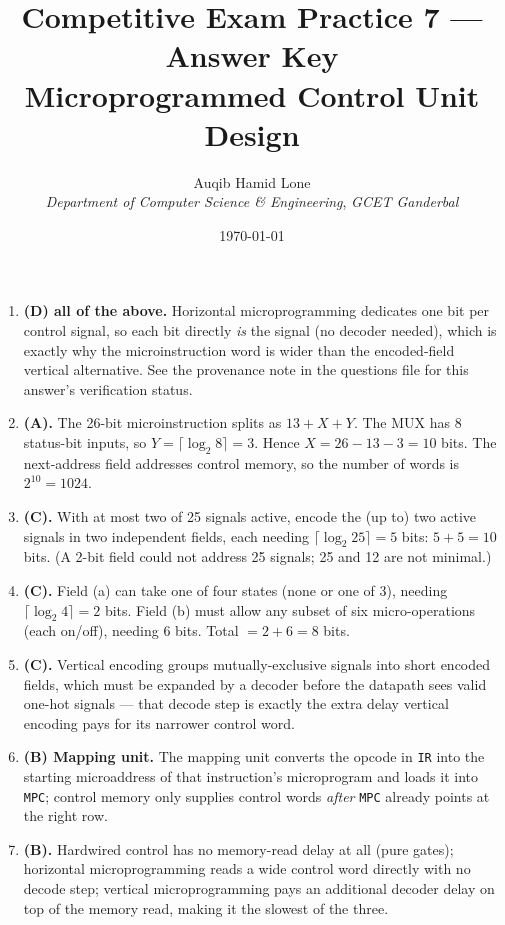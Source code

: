 \documentclass[11pt]{article}
\title{Competitive Exam Practice 7 --- Answer Key\\\large Microprogrammed Control Unit Design}
\author{Auqib Hamid Lone\\[0.3em]
  \emph{Department of Computer Science \& Engineering}, \emph{GCET Ganderbal}}
\date{\today}
\begin{document}
\maketitle

\begin{enumerate}
\item[\textbf{Q1}] \textbf{(D) all of the above.} Horizontal microprogramming dedicates one bit per control signal, so each bit directly \emph{is} the signal (no decoder needed), which is exactly why the microinstruction word is wider than the encoded-field vertical alternative. See the provenance note in the questions file for this answer's verification status.

\item[\textbf{Q2}] \textbf{(A).} The 26-bit microinstruction splits as $13 + X + Y$. The MUX has 8 status-bit inputs, so $Y = \lceil \log_2 8 \rceil = 3$. Hence $X = 26 - 13 - 3 = 10$ bits. The next-address field addresses control memory, so the number of words is $2^{10} = 1024$.

\item[\textbf{Q3}] \textbf{(C).} With at most two of 25 signals active, encode the (up to) two active signals in two independent fields, each needing $\lceil \log_2 25 \rceil = 5$ bits: $5 + 5 = 10$ bits. (A 2-bit field could not address 25 signals; 25 and 12 are not minimal.)

\item[\textbf{Q4}] \textbf{(C).} Field (a) can take one of four states (none or one of 3), needing $\lceil \log_2 4 \rceil = 2$ bits. Field (b) must allow any subset of six micro-operations (each on/off), needing 6 bits. Total $= 2 + 6 = 8$ bits.

\item[\textbf{Q5}] \textbf{(C).} Vertical encoding groups mutually-exclusive signals into short encoded fields, which must be expanded by a decoder before the datapath sees valid one-hot signals --- that decode step is exactly the extra delay vertical encoding pays for its narrower control word.

\item[\textbf{Q6}] \textbf{(B) Mapping unit.} The mapping unit converts the opcode in \texttt{IR} into the starting microaddress of that instruction's microprogram and loads it into \texttt{MPC}; control memory only supplies control words \emph{after} \texttt{MPC} already points at the right row.

\item[\textbf{Q7}] \textbf{(B).} Hardwired control has no memory-read delay at all (pure gates); horizontal microprogramming reads a wide control word directly with no decode step; vertical microprogramming pays an additional decoder delay on top of the memory read, making it the slowest of the three.
\end{enumerate}
\end{document}
